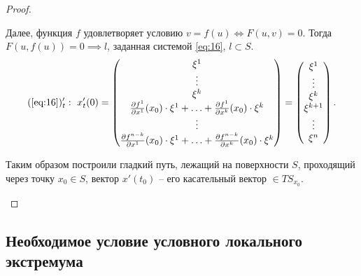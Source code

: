 \begin{proof}
\begin{enumerate}
              Далее, функция $f$ удовлетворяет условию $v = f(u) \iff F(u,v) = 0$. Тогда $F(u,f(u)) = 0\implies l$, заданная системой \ref{eq:16}, $l \subset S$.
              \[
                  (\text{\ref{eq:16}})_t': \ x_t'(0) = \left(\begin{matrix}
                          \xi^1                                                                                                  \\
                          \vdots                                                                                                 \\
                          \xi^k                                                                                                  \\
                          \frac{\partial f^1}{\partial x^1}(x_0)\cdot \xi^1 + \ldots + \frac{\partial f^1}{\partial x^k}(x_0)\cdot \xi^k \\
                          \vdots                                                                                                 \\
                          \frac{\partial f^{n-k}}{\partial x^1}(x_0)\cdot \xi^1 + \ldots + \frac{\partial f^{n-k}}{\partial x^k}(x_0)\cdot \xi^k
                      \end{matrix}\right) = \left(\begin{matrix}
                          \xi^1 \\ \vdots \\ \xi^k \\ \xi^{k+1} \\ \vdots \\ \xi^n
                      \end{matrix}\right).
              \]

              Таким образом построили гладкий путь, лежащий на поверхности $S$, проходящий через точку $x_0 \in S$, вектор $x'(t_0)$ -- его касательный вектор $\in TS_{x_0}$.
    \end{enumerate}
\end{proof}

\setcounter{subsection}{24}

\subsection{Необходимое условие условного локального экстремума}

